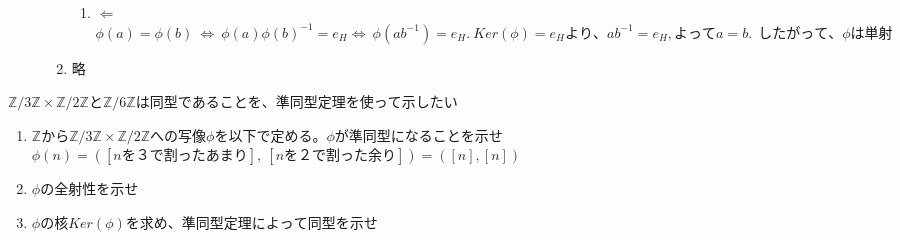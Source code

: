 \documentclass[dvipdfmx]{jsarticle}
\begin{document}
\begin{description}
\begin{enumerate}
\begin{enumerate}
      \item $\Leftarrow$\\
      $\phi(a) = \phi(b) \ \Leftrightarrow \ \phi(a)\phi(b)^{-1} = e_H \Leftrightarrow \ \phi(ab^{-1}) = e_H. \ Ker(\phi) = {e_H}より、ab^{-1} = e_H,よってa = b. \ \ したがって、\phi は単射$

    \end{enumerate}
    \item 略
  \end{enumerate}
\end{description}


\begin{tcolorbox}[colframe=black!50,colback=white,colbacktitle=black!50,coltitle=white,fonttitle=\bfseries\sffamily,title=問題4]
$\mathbb{Z}/3\mathbb{Z} \times \mathbb{Z}/2\mathbb{Z}と\mathbb{Z}/6\mathbb{Z}は同型であることを、準同型定理を使って示したい$
\begin{enumerate}
  \item $\mathbb{Z}から\mathbb{Z} / 3\mathbb{Z} \times \mathbb{Z} / 2\mathbb{Z}への写像 \phi を以下で定める。\phi　が準同型になることを示せ$\\
  $\phi(n) = ([nを３で割ったあまり], \ [nを２で割った余り]) = ([n],[n])$
  \item $\phi　の全射性を示せ$
  \item $\phi の核Ker(\phi)を求め、準同型定理によって同型を示せ$
\end{enumerate}
\end{tcolorbox}
\end{document}
